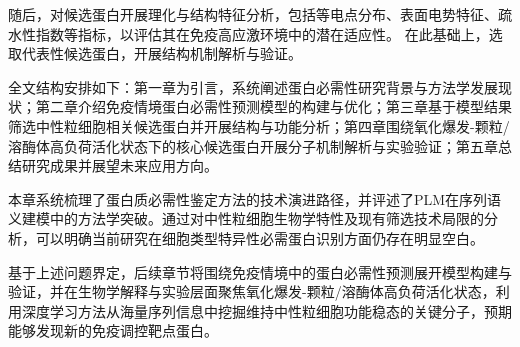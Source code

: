 随后，对候选蛋白开展理化与结构特征分析，包括等电点分布、表面电势特征、疏水性指数等指标，以评估其在免疫高应激环境中的潜在适应性。
在此基础上，选取代表性候选蛋白，开展结构机制解析与验证。

全文结构安排如下：第一章为引言，系统阐述蛋白必需性研究背景与方法学发展现状；第二章介绍免疫情境蛋白必需性预测模型的构建与优化；第三章基于模型结果筛选中性粒细胞相关候选蛋白并开展结构与功能分析；第四章围绕氧化爆发-颗粒/溶酶体高负荷活化状态下的核心候选蛋白开展分子机制解析与实验验证；第五章总结研究成果并展望未来应用方向。

本章系统梳理了蛋白质必需性鉴定方法的技术演进路径，并评述了PLM在序列语义建模中的方法学突破。通过对中性粒细胞生物学特性及现有筛选技术局限的分析，可以明确当前研究在细胞类型特异性必需蛋白识别方面仍存在明显空白。

基于上述问题界定，后续章节将围绕免疫情境中的蛋白必需性预测展开模型构建与验证，并在生物学解释与实验层面聚焦氧化爆发-颗粒/溶酶体高负荷活化状态，利用深度学习方法从海量序列信息中挖掘维持中性粒细胞功能稳态的关键分子，预期能够发现新的免疫调控靶点蛋白。
